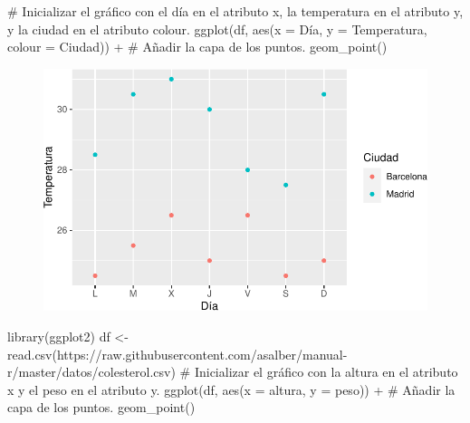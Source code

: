 \documentclass[
  a4paper,
]{scrreport}
\newenvironment{Shaded}{\begin{snugshade}}{\end{snugshade}}
\newcommand{\AttributeTok}[1]{\textcolor[rgb]{0.40,0.45,0.13}{#1}}
\newcommand{\CommentTok}[1]{\textcolor[rgb]{0.37,0.37,0.37}{#1}}
\newcommand{\FunctionTok}[1]{\textcolor[rgb]{0.28,0.35,0.67}{#1}}
\newcommand{\NormalTok}[1]{\textcolor[rgb]{0.00,0.23,0.31}{#1}}
\newcommand{\OtherTok}[1]{\textcolor[rgb]{0.00,0.23,0.31}{#1}}
\newcommand{\SpecialCharTok}[1]{\textcolor[rgb]{0.37,0.37,0.37}{#1}}
\newcommand{\StringTok}[1]{\textcolor[rgb]{0.13,0.47,0.30}{#1}}
\theoremstyle{definition}
\theoremstyle{definition}
\theoremstyle{remark}
\begin{document}
\begin{Shaded}
\begin{Highlighting}[]
\CommentTok{\# Inicializar el gráfico con el día en el atributo x, la temperatura en el atributo y, y la ciudad en el atributo colour.}
\FunctionTok{ggplot}\NormalTok{(df, }\FunctionTok{aes}\NormalTok{(}\AttributeTok{x =}\NormalTok{ Día, }\AttributeTok{y =}\NormalTok{ Temperatura, }\AttributeTok{colour =}\NormalTok{ Ciudad)) }\SpecialCharTok{+}
\CommentTok{\# Añadir la capa de los puntos.}
    \FunctionTok{geom\_point}\NormalTok{()}
\end{Highlighting}
\end{Shaded}

\begin{figure}[H]

{\centering \includegraphics{./07-graficos_files/figure-pdf/unnamed-chunk-3-1.pdf}

}

\end{figure}

\begin{Shaded}
\begin{Highlighting}[]
\FunctionTok{library}\NormalTok{(ggplot2)}
\NormalTok{df }\OtherTok{\textless{}{-}} \FunctionTok{read.csv}\NormalTok{(}\StringTok{\textquotesingle{}https://raw.githubusercontent.com/asalber/manual{-}r/master/datos/colesterol.csv\textquotesingle{}}\NormalTok{)}
\CommentTok{\# Inicializar el gráfico con la altura en el atributo x y el peso en el atributo y.}
\FunctionTok{ggplot}\NormalTok{(df, }\FunctionTok{aes}\NormalTok{(}\AttributeTok{x =}\NormalTok{ altura, }\AttributeTok{y =}\NormalTok{ peso)) }\SpecialCharTok{+}
\CommentTok{\# Añadir la capa de los puntos.}
    \FunctionTok{geom\_point}\NormalTok{()}
\end{Highlighting}
\end{Shaded}
\end{document}
